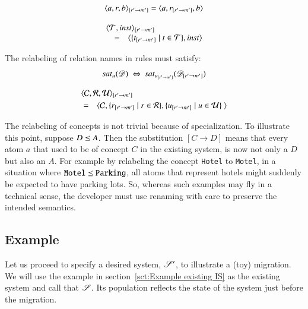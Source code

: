\documentclass{elsarticle}
\begin{document}
\begin{definition}
   \[\subst{r'}{m'}{\triple{a}{r}{b}} = \triple{a}{\subst{r'}{m'}{r}}{b}\]
\end{definition}
\begin{definition}
   \[\begin{array}{rcl}
      \rlap{$\subst{r'}{m'}{\pair{\triples}{\inst}}$}\\
      &=&\pair{\{\subst{r'}{m'}{t}\mid t\in\triples\}}{\inst}
   \end{array}\]
\end{definition}
   The relabeling of relation names in rules must satisfy:
\begin{equation}
   \sat{u}{\dataset}\ \Leftrightarrow\ \sat{\subst{r'}{m'}{u}}{\subst{r'}{m'}{\dataset}}
\end{equation}
\begin{definition}
   \begin{eqnarray}
      \rlap{$\subst{r'}{m'}{\triple{\concepts}{\rels}{\rules}}$}\notag\\
      &=&\la\concepts,\{\subst{r'}{m'}{r} \mid r\in\rels\}, \{\subst{r'}{m'}{u} \mid u\in\rules\}\ \ra\notag
   \end{eqnarray}
\end{definition}
   
   The relabeling of concepts is not trivial because of specialization.
   To illustrate this point, suppose $D\isa A$.
   Then the substitution $[C\rightarrow D]$ means that every atom $a$ that used to be of concept $C$ in the existing system, is now not only a $D$ but also an $A$.
   For example by relabeling the concept {\tt Hotel} to {\tt Motel}, in a situation where ${\tt Motel}\isa{\tt Parking}$,
   all atoms that represent hotels might suddenly be expected to have parking lots.
   So, whereas such examples may fly in a technical sense, the developer must use renaming with care to preserve the intended semantics.
\subsection{Example}
   Let us proceed to specify a desired system, $\infsys'$, to illustrate a (toy) migration.
   We will use the example in section~\ref{sct:Example existing IS} as the existing system
   and call that $\infsys$.
   Its population reflects the state of the system just before the migration.
\end{document}
